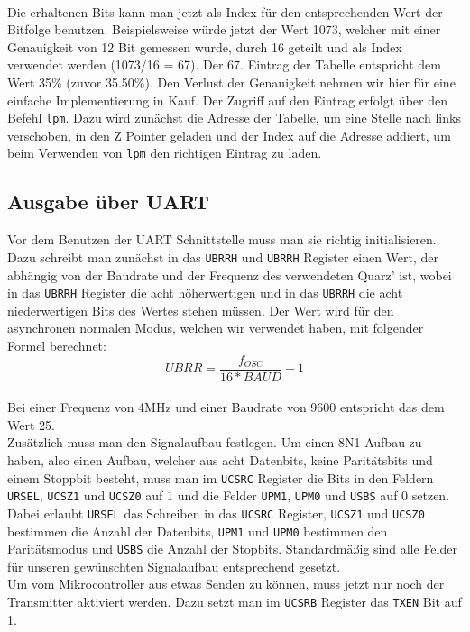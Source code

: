 \documentclass[]{article}
\begin{document}
\\
Die erhaltenen Bits kann man jetzt als Index für den entsprechenden Wert der Bitfolge benutzen. Beispielsweise würde jetzt der Wert 1073, welcher mit einer Genauigkeit von 12 Bit gemessen wurde, durch 16 geteilt und als Index verwendet werden (1073/16 = 67). Der 67. Eintrag der Tabelle entspricht dem Wert 35\% (zuvor 35.50\%). Den Verlust der Genauigkeit nehmen wir hier für eine einfache Implementierung in Kauf. Der Zugriff auf den Eintrag erfolgt über den Befehl \texttt{lpm}. Dazu wird zunächst die Adresse der Tabelle, um eine Stelle nach links verschoben, in den Z Pointer geladen und der Index auf die Adresse addiert, um beim Verwenden von \texttt{lpm} den richtigen Eintrag zu laden.

\subsection{Ausgabe über UART}
Vor dem Benutzen der UART Schnittstelle muss man sie richtig initialisieren. Dazu schreibt man zunächst in das \texttt{UBRRH} und \texttt{UBRRH} Register einen Wert, der abhängig von der Baudrate und der Frequenz des verwendeten Quarz' ist, wobei in das \texttt{UBRRH} Register die acht höherwertigen und in das \texttt{UBRRH} die acht niederwertigen Bits des Wertes stehen müssen. Der Wert wird für den asynchronen normalen Modus, welchen wir verwendet haben, mit folgender Formel berechnet:
\begin{equation*}
UBRR = \frac{f_{OSC}}{16*BAUD} -1
\end{equation*}
\\Bei einer Frequenz von 4MHz und einer Baudrate von 9600 entspricht das dem Wert 25. \\Zusätzlich muss man den Signalaufbau festlegen. Um einen 8N1 Aufbau zu haben, also einen Aufbau, welcher aus acht Datenbits, keine Paritätsbits und einem Stoppbit besteht, muss man im \texttt{UCSRC} Register die Bits in den Feldern \texttt{URSEL}, \texttt{UCSZ1} und \texttt{UCSZ0} auf 1 und die Felder \texttt{UPM1}, \texttt{UPM0} und \texttt{USBS} auf 0 setzen. Dabei erlaubt \texttt{URSEL} das Schreiben in das \texttt{UCSRC} Register, \texttt{UCSZ1} und \texttt{UCSZ0} bestimmen die Anzahl der Datenbits, \texttt{UPM1} und \texttt{UPM0} bestimmen den Paritätsmodus und \texttt{USBS} die Anzahl der Stopbits. Standardmäßig sind alle Felder für unseren gewünschten Signalaufbau entsprechend gesetzt. 
\\Um vom Mikrocontroller aus etwas Senden zu können, muss jetzt nur noch der Transmitter aktiviert werden. Dazu setzt man im \texttt{UCSRB} Register das \texttt{TXEN} Bit auf 1.
\end{document}

